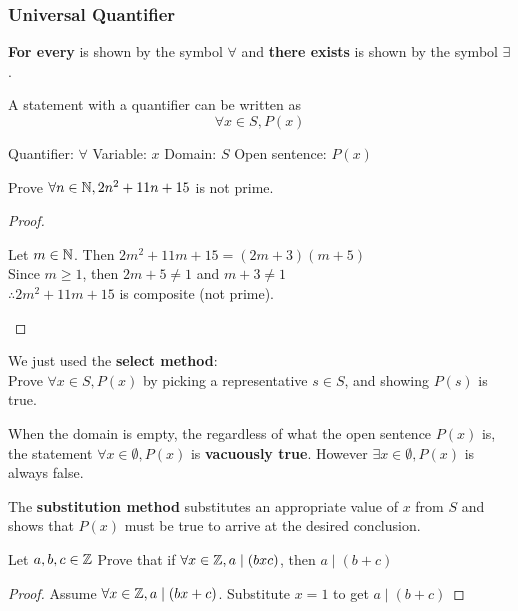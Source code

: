 \documentclass[english, 12pt]{article}
\begin{document}
\subsubsection{Universal Quantifier}
\begin{exmp}
\textbf{For every} is shown by the symbol $\forall$ and \textbf{there exists} is shown by the symbol $\exists$.
\end{exmp}
\begin{exmp}
A statement with a quantifier can be written as 
\[\forall x \in S, P(x) \]
\begin{center}
Quantifier: $\forall$\qquad
Variable: $x$\qquad
Domain: $S$\qquad
Open sentence: $P(x)$
\end{center}
\end{exmp}
\begin{exmp}
Prove $\forall n \in {\mathbb{N}} , 2n^2+11n+15$ is not prime.
\begin{proof}
\qquad
\begin{center}
Let $m \in {\mathbb{N}} $. Then $2m^2+11m+15 = (2m+3)(m+5)$\\
Since $m \geq 1$, then $2m+5 \neq 1$ and $m + 3 \neq 1$\\
$\therefore 2m^2+11m+15$ is composite (not prime).
\end{center}
\end{proof}
\end{exmp}
\begin{mthd}
We just used the \textbf{select method}:\\
Prove $\forall x \in S, P(x)$ by picking a representative $s \in S$, and showing $P(s)$ is true.
\end{mthd}
\begin{defn}
When the domain is empty, the regardless of what the open sentence $P(x)$ is, the statement $\forall x \in \emptyset, P(x)$ is \textbf{vacuously true}. However  $\exists x \in \emptyset, P(x)$ is always false.
\end{defn}
\begin{mthd}
The \textbf{substitution method} substitutes an appropriate value of $x$ from $S$ and shows that $P(x)$ must be true to arrive at the desired conclusion.
\end{mthd}
\begin{exmp}
Let $a,b,c \in {\mathbb{Z}}$ Prove that if $\forall x \in {\mathbb{Z}}, a \mid (bxc)$, then $ a \mid (b+c)$
\begin{proof}
Assume $\forall x \in {\mathbb{Z}}, a \mid (bx+c)$. Substitute $x=1$ to get $a \mid (b+c)$
\end{proof}
\end{exmp}
\end{document}
